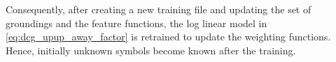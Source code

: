 Consequently, after creating a new training file and updating the set of groundings and the feature functions, the log linear model in \eqref{eq:dcg_upup_away_factor} is retrained to update the weighting functions. Hence, initially unknown symbols become known after the training.  



